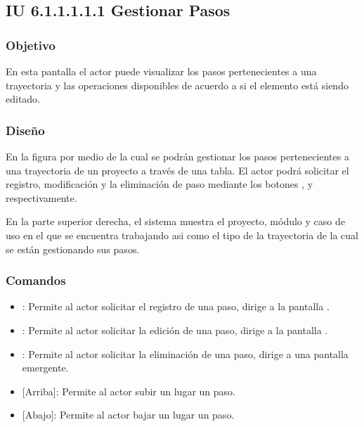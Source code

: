 \subsection{IU 6.1.1.1.1.1 Gestionar Pasos}

\subsubsection{Objetivo}
	En esta pantalla el actor puede visualizar los pasos pertenecientes a una trayectoria y las operaciones disponibles de acuerdo a si el elemento está siendo editado.
\subsubsection{Diseño}
	En la figura  por medio de la cual se podrán gestionar los pasos pertenecientes a una trayectoria de un proyecto a través de una tabla. El actor podrá solicitar el registro, modificación y la eliminación de paso mediante los botones , \editar y \eliminar respectivamente.
	
	En la parte superior derecha, el sistema muestra el proyecto, módulo y caso de uso en el que se encuentra trabajando asi como el tipo de la trayectoria de la cual se están gestionando sus pasos.

\subsubsection{Comandos}
\begin{itemize}
	\item {}: Permite al actor solicitar el registro de una paso, dirige a la pantalla .
	\item \editar [Modificar]: Permite al actor solicitar la edición de una paso, dirige a la pantalla .
	\item \eliminar [Eliminar]: Permite al actor solicitar la eliminación de una paso, dirige a una pantalla emergente.
	\item {} [Arriba]: Permite al actor subir un lugar un paso.
	\item {} [Abajo]: Permite al actor bajar un lugar un paso.	
\end{itemize}
